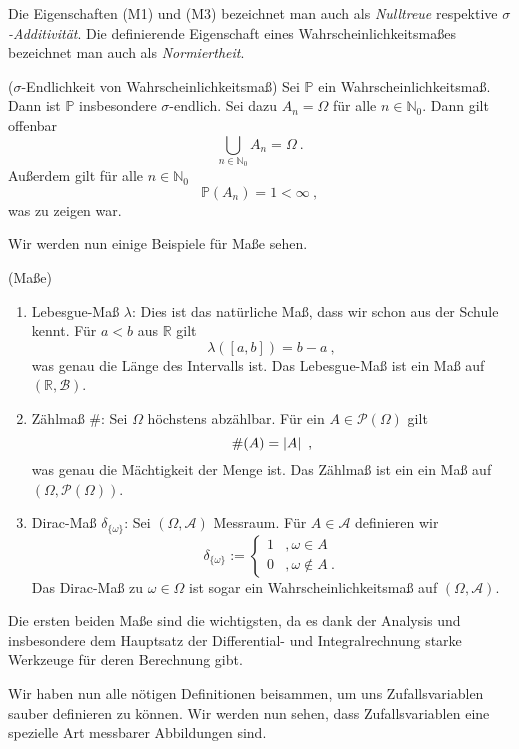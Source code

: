 Die Eigenschaften (M1) und (M3) bezeichnet man auch als \textit{Nulltreue} respektive \textit{$\sigma$-Additivität}. Die definierende Eigenschaft eines Wahrscheinlichkeitsmaßes bezeichnet man auch als \textit{Normiertheit}.

\begin{Bemerkung}{($\sigma$-Endlichkeit von Wahrscheinlichkeitsmaß)}
Sei $\mathbb{P}$ ein Wahrscheinlichkeitsmaß. Dann ist $\mathbb{P}$ insbesondere $\sigma$-endlich. Sei dazu $A_n = \Omega$ für alle $n \in \mathbb{N}_0$. Dann gilt offenbar
\[\bigcup_{n \in \mathbb{N}_0} A_n = \Omega~.\]
Außerdem gilt für alle $n \in \mathbb{N}_0$
\[\mathbb{P}(A_n) = 1 < \infty~,\]
was zu zeigen war.
\end{Bemerkung}

Wir werden nun einige Beispiele für Maße sehen.

\begin{Beispiel}{(Maße)}
\begin{enumerate}[label=(\roman*)]
\item Lebesgue-Maß $\lambda$: Dies ist das \glqq natürliche\grqq{} Maß, dass wir schon aus der Schule kennt. Für $a < b$ aus $\mathbb{R}$ gilt
\[\lambda([a, b]) = b - a~,\]
was genau die Länge des Intervalls ist. Das Lebesgue-Maß ist ein Maß auf $(\mathbb{R}, \mathscr{B})$. 

\item Zählmaß $\#$: Sei $\Omega$ höchstens abzählbar. Für ein $A \in \mathcal{P}(\Omega)$ gilt
\[\#(A) = \left| A \right|~,\]
was genau die Mächtigkeit der Menge ist. Das Zählmaß ist ein ein Maß auf $(\Omega, \mathcal{P}(\Omega))$.

\item Dirac-Maß $\delta_{\{\omega\}}$: Sei $(\Omega, \mathscr{A})$ Messraum. Für $A \in \mathscr{A}$ definieren wir
\[\delta_{\{\omega\}} := \begin{cases}
1 &, \omega \in A\\
0 &, \omega \notin A~.
\end{cases}\]
Das Dirac-Maß zu $\omega \in \Omega$ ist sogar ein Wahrscheinlichkeitsmaß auf $(\Omega, \mathscr{A})$.
\end{enumerate}
Die ersten beiden Maße sind die wichtigsten, da es dank der Analysis und insbesondere dem Hauptsatz der Differential- und Integralrechnung starke Werkzeuge für deren Berechnung gibt.
\end{Beispiel}

\newpage

Wir haben nun alle nötigen Definitionen beisammen, um uns Zufallsvariablen sauber definieren zu können. Wir werden nun sehen, dass Zufallsvariablen eine spezielle Art messbarer Abbildungen sind.

